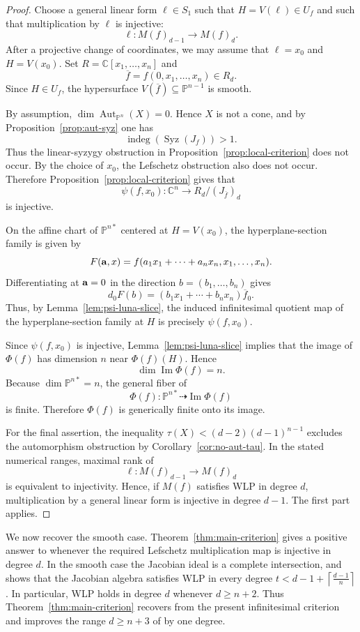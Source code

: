 \documentclass[11pt]{amsart}
\theoremstyle{plain}
\theoremstyle{definition}
\numberwithin{equation}{section}
\newcommand{\C}{\mathbb{C}}
\newcommand{\PP}{\mathbb{P}}
\DeclareMathOperator{\Aut}{Aut}
\begin{document}
\begin{proof}
Choose a general linear form $\ell\in S_1$ such that $H=V(\ell)\in U_f$ and
such that multiplication by $\ell$ is injective:
\[
\ell:M(f)_{d-1}\to M(f)_d.
\]
After a projective change of coordinates, we may assume that $\ell=x_0$ and
$H=V(x_0)$. Set $R=\C[x_1,\ldots,x_n]$ and
\[
\overline f=f(0,x_1,\ldots,x_n)\in R_d .
\]
Since $H\in U_f$, the hypersurface $V(\overline f)\subseteq\PP^{n-1}$ is
smooth.

By assumption, $\dim\Aut_{\PP^n}(X)=0$. Hence $X$ is not a cone, and by
Proposition~\ref{prop:aut-syz} one has
\[
\operatorname{indeg}(\operatorname{Syz}(J_f))>1.
\]
Thus the linear-syzygy obstruction in Proposition~\ref{prop:local-criterion}
does not occur. By the choice of $x_0$, the Lefschetz obstruction also does not
occur. Therefore Proposition~\ref{prop:local-criterion} gives that
\[
\psi(f,x_0):\C^n\to R_d/(J_{\overline f})_d
\]
is injective.

On the affine chart of $\PP^{n*}$ centered at $H=V(x_0)$, the hyperplane-section
family is given by
\[
F({\bf a},x)=f(a_1x_1+\cdots+a_nx_n,x_1,\ldots,x_n).
\]
Differentiating at ${\bf a}=0$ in the direction
$b=(b_1,\ldots,b_n)$ gives
\[
d_0F(b)=(b_1x_1+\cdots+b_nx_n)\overline f_0.
\]
Thus, by Lemma~\ref{lem:psi-luna-slice}, the induced infinitesimal quotient map
of the hyperplane-section family at $H$ is precisely $\psi(f,x_0)$.

Since $\psi(f,x_0)$ is injective, Lemma~\ref{lem:psi-luna-slice} implies that
the image of $\Phi(f)$ has dimension $n$ near $\Phi(f)(H)$. Hence
\[
\dim\operatorname{Im}\Phi(f)=n.
\]
Because $\dim\PP^{n*}=n$, the general fiber of
\[
\Phi(f):\PP^{n*}\dashrightarrow \operatorname{Im}\Phi(f)
\]
is finite. Therefore $\Phi(f)$ is generically finite onto its image.

For the final assertion, the inequality
$\tau(X)<(d-2)(d-1)^{n-1}$ excludes the automorphism obstruction by
Corollary~\ref{cor:no-aut-tau}. In the stated numerical ranges, maximal rank of
\[
\ell:M(f)_{d-1}\to M(f)_d
\]
is equivalent to injectivity. Hence, if $M(f)$ satisfies WLP in degree $d$,
multiplication by a general linear form is injective in degree $d-1$. The first
part applies.
\end{proof}

We now recover the smooth case. Theorem~\ref{thm:main-criterion} gives a positive answer to \cite[Question~1.1]{PRT} whenever the required Lefschetz multiplication map is injective in degree $d$. In the smooth case the Jacobian ideal is a complete intersection, and \cite[Theorem~4.5]{BM} shows that the Jacobian algebra satisfies WLP in every degree $t<d-1+\left\lceil\frac{d-1}{n}\right\rceil$. In particular, WLP holds in degree $d$ whenever $d\geq n+2$. Thus Theorem~\ref{thm:main-criterion} recovers
\cite[Corollary~4.7]{BM} from the present  infinitesimal criterion and improves the range $d\geq n+3$ of \cite[Theorem~1.3]{PRT} by one degree.
\end{document}
